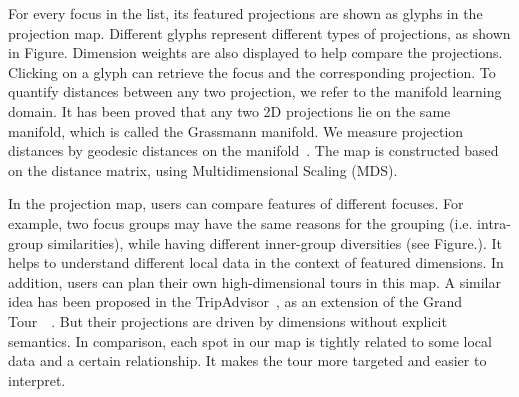 For every focus in the list, its featured projections are shown as glyphs in the projection map. Different glyphs represent different types of projections, as shown in Figure.  Dimension weights are also displayed to help compare the projections. Clicking on a glyph can retrieve the focus and the corresponding projection. To quantify distances between any two projection, we refer to the manifold learning domain. It has been proved that any two 2D projections lie on the same manifold, which is called the Grassmann manifold. We measure projection distances by geodesic distances on the manifold~\cite{absil2004riemannian}. The map is constructed based on the distance matrix, using Multidimensional Scaling (MDS).

In the projection map, users can compare features of different focuses. For example, two focus groups may have the same reasons for the grouping (i.e. intra-group similarities), while having different inner-group diversities (see Figure.).  It helps to understand different local data in the context of featured dimensions. In addition, users can plan their own high-dimensional tours in this map. A similar idea has been proposed in the TripAdvisor~\cite{DBLP:journals/tvcg/NamM13}, as an extension of the Grand Tour~\cite{asimov1985grand}~\cite{cook1995grand}. But their projections are driven by dimensions without explicit semantics. In comparison, each spot in our map is tightly related to some local data and a certain relationship. It makes the tour more targeted and easier to interpret.